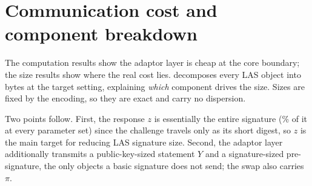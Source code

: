 \section{Communication cost and component breakdown}
\label{sec:res-comm}

The computation results show the adaptor layer is cheap at the core boundary; the size
results show where the real cost lies.  decomposes every LAS object
into bytes at the target setting, explaining \emph{which} component drives the size.
Sizes are fixed by the encoding, so they are exact and carry no dispersion.

\begin{table}[htbp]
  \centering
  \caption[Serialized size of every LAS object]{Serialized size of every LAS object at
  the \emph{Simplified Dilithium-III} (target) setting, in packed wire bytes (not
  on-chain gas), with its notation, that of Esgin et al.\ \cite{esgin2020post}, except that a signature carries the
  \emph{digest} $\tilde c$, not the polynomial $c$ (\cref{tab:notation}).
  ``In the basic signature?'' marks which
  objects LAS shares with the base scheme and which it adds.
  Three facts read off directly: the signature, pre-signature, and adapted signature are
  the same serialized size (adaptation changes the \emph{value} of the response, not its length); the
  response $z$ dominates every signature; and the only \emph{public-key-shaped} object LAS
  adds over a basic signature is the statement $Y$ (the protocol also transmits a
  signature-sized pre-signature, which the table marks as added). The sizes
  hold for the C and the Rust implementation alike: the wire encoding is byte-identical
  in both by construction, asserted programmatically on every Rust run
  (\cref{sec:res-rust}). Sizes at
  every parameter set: \cref{tab:components} (appendix).}
  \label{tab:complete-l3}
  \small
  
\end{table}

Two points follow. First, the response $z$ is essentially the entire signature
(\zPctTarget\% of it at every parameter set) since the challenge travels only as its
short digest, so $z$ is the main target for reducing LAS signature size. Second,
the adaptor layer additionally transmits a public-key-sized statement $Y$ and a
signature-sized pre-signature, the only objects a basic signature does not send; the
swap also carries $\pi$.

